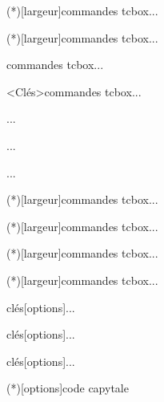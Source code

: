 \documentclass[a4paper,french,11pt]{article}
\begin{document}
\begin{codetex}
\begin{CodePythonLst}(*)[largeur]{commandes tcbox}...\end{CodePythonLst}
\begin{CodePythonLstAlt}(*)[largeur]{commandes tcbox}...\end{CodePythonLstAlt}
\begin{CodePiton}{commandes tcbox}...\end{CodePiton}
\begin{PitonConsole}<Clés>{commandes tcbox}...\end{PitonConsole}
\begin{CodePythontex}[options]{}...\end{CodePythontex}
\begin{CodePythontexAlt}[options]{}...\end{CodePythontexAlt}
\begin{ConsolePythontex}[options]{}...\end{ConsolePythontex}
\begin{CodePythonMinted}(*)[largeur]{commandes tcbox}...\end{CodePythonMinted}
\begin{CodePythonMintedAlt}(*)[largeur]{commandes tcbox}...\end{CodePythonMintedAlt}

\begin{PseudoCode}(*)[largeur]{commandes tcbox}...\end{PseudoCode}
\begin{PseudoCodeAlt}(*)[largeur]{commandes tcbox}...\end{PseudoCodeAlt}
\end{codetex}

\pagebreak

\begin{codetex}
\begin{TerminalWin}[largeur]{clés}[options]...\end{TerminalWin}
\begin{TerminalUnix}[largeur]{clés}[options]...\end{TerminalUnix}
\begin{TerminalOSX}[largeur]{clés}[options]...\end{TerminalOSX}

\CartoucheCapytale(*)[options]{code capytale}
\end{codetex}
\end{document}
